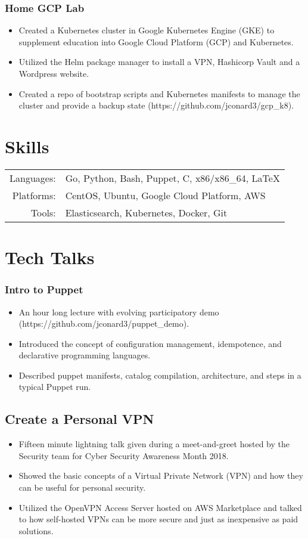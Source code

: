 \documentclass[letterpaper]{article}
\begin{document}
\subsubsection*{Home GCP Lab}
\begin{itemize}[noitemsep]
	\item Created a Kubernetes cluster in Google Kubernetes Engine (GKE) to supplement education into Google Cloud Platform (GCP) and Kubernetes.
	\item Utilized the Helm package manager to install a VPN, Hashicorp Vault and a Wordpress website.
	\item Created a repo of bootstrap scripts and Kubernetes manifests to manage the cluster and provide a backup state (https://github.com/jconard3/gcp\_k8). 
\end{itemize}

\section*{Skills}
\begin{tabular}{rl}
    Languages: & Go, Python, Bash, Puppet, C, x86/x86\_64, \LaTeX\\
    Platforms: & CentOS, Ubuntu, Google Cloud Platform, AWS\\
    Tools: & Elasticsearch, Kubernetes, Docker, Git\\
\end{tabular}

\section*{Tech Talks}
\subsubsection*{Intro to Puppet}
\begin{itemize}[noitemsep]
	\item An hour long lecture with evolving participatory demo (https://github.com/jconard3/puppet\_demo).
	\item Introduced the concept of configuration management, idempotence, and declarative programming languages. 
	\item Described puppet manifests, catalog compilation, architecture, and steps in a typical Puppet run. 
\end{itemize}
\subsection*{Create a Personal VPN}
\begin{itemize}[noitemsep]
	\item Fifteen minute lightning talk given during a meet-and-greet hosted by the Security team for Cyber Security Awareness Month 2018.
	\item Showed the basic concepts of a Virtual Private Network (VPN) and how they can be useful for personal security.
	\item Utilized the OpenVPN Access Server hosted on AWS Marketplace and talked to how self-hosted VPNs can be more secure and just as inexpensive as paid solutions.
\end{itemize}
\end{document}
